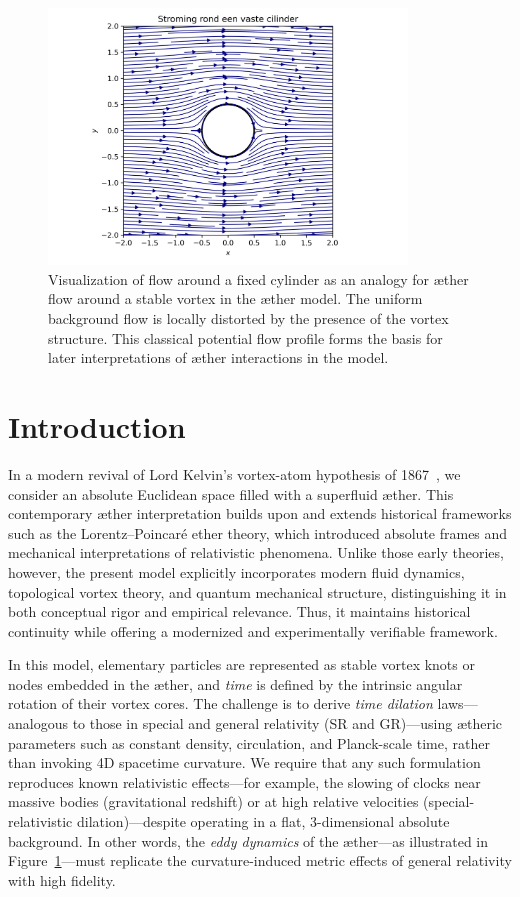 \begin{figure}[htbp]
    \centering
    \includegraphics[width=0.85\textwidth]{02_cylinder_flow}
    \caption{Visualization of flow around a fixed cylinder as an analogy for æther flow around a stable vortex in the æther model. The uniform background flow is locally distorted by the presence of the vortex structure. This classical potential flow profile forms the basis for later interpretations of æther interactions in the model.}
    \label{fig:cylinderflow}
\end{figure}

\section{Introduction}
In a modern revival of Lord Kelvin's vortex-atom hypothesis of 1867~\cite{Kelvin1867-vortex}, we consider an absolute Euclidean space filled with a superfluid æther. This contemporary æther interpretation builds upon and extends historical frameworks such as the Lorentz–Poincaré ether theory, which introduced absolute frames and mechanical interpretations of relativistic phenomena. Unlike those early theories, however, the present model explicitly incorporates modern fluid dynamics, topological vortex theory, and quantum mechanical structure, distinguishing it in both conceptual rigor and empirical relevance. Thus, it maintains historical continuity while offering a modernized and experimentally verifiable framework.

In this model, elementary particles are represented as stable vortex knots or nodes embedded in the æther, and \emph{time} is defined by the intrinsic angular rotation of their vortex cores. The challenge is to derive \emph{time dilation} laws—analogous to those in special and general relativity (SR and GR)—using ætheric parameters such as constant density, circulation, and Planck-scale time, rather than invoking 4D spacetime curvature. We require that any such formulation reproduces known relativistic effects—for example, the slowing of clocks near massive bodies (gravitational redshift) or at high relative velocities (special-relativistic dilation)—despite operating in a flat, 3-dimensional absolute background. In other words, the \emph{eddy dynamics} of the æther—as illustrated in Figure~\ref{fig:cylinderflow}—must replicate the curvature-induced metric effects of general relativity with high fidelity.

